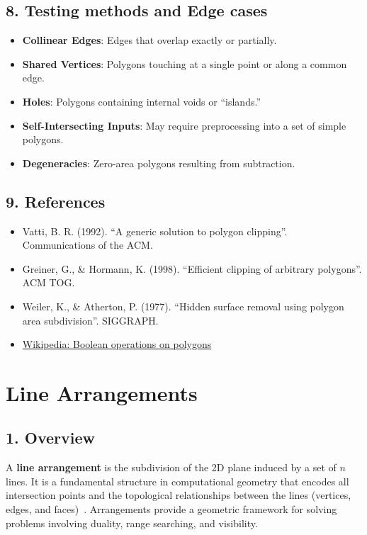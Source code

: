\subsection{8. Testing methods and Edge cases}
\begin{itemize}
    \item \textbf{Collinear Edges}: Edges that overlap exactly or partially.
    \item \textbf{Shared Vertices}: Polygons touching at a single point or along a common edge.
    \item \textbf{Holes}: Polygons containing internal voids or ``islands.''
    \item \textbf{Self-Intersecting Inputs}: May require preprocessing into a set of simple polygons.
    \item \textbf{Degeneracies}: Zero-area polygons resulting from subtraction.
\end{itemize}

\subsection{9. References}
\begin{itemize}
    \item Vatti, B. R. (1992). ``A generic solution to polygon clipping''. Communications of the ACM.
    \item Greiner, G., \& Hormann, K. (1998). ``Efficient clipping of arbitrary polygons''. ACM TOG.
    \item Weiler, K., \& Atherton, P. (1977). ``Hidden surface removal using polygon area subdivision''. SIGGRAPH.
    \item \href{https://en.wikipedia.org/wiki/Boolean_operations_on_polygons}{Wikipedia: Boolean operations on polygons}
\end{itemize}

\section{Line Arrangements}
\label{sec:line_arrangements}

\subsection{1. Overview}
A \textbf{line arrangement} is the subdivision of the 2D plane induced by a set of $n$ lines. It is a fundamental structure in computational geometry that encodes all intersection points and the topological relationships between the lines (vertices, edges, and faces)~\cite{edelsbrunner1986}. Arrangements provide a geometric framework for solving problems involving duality, range searching, and visibility.


